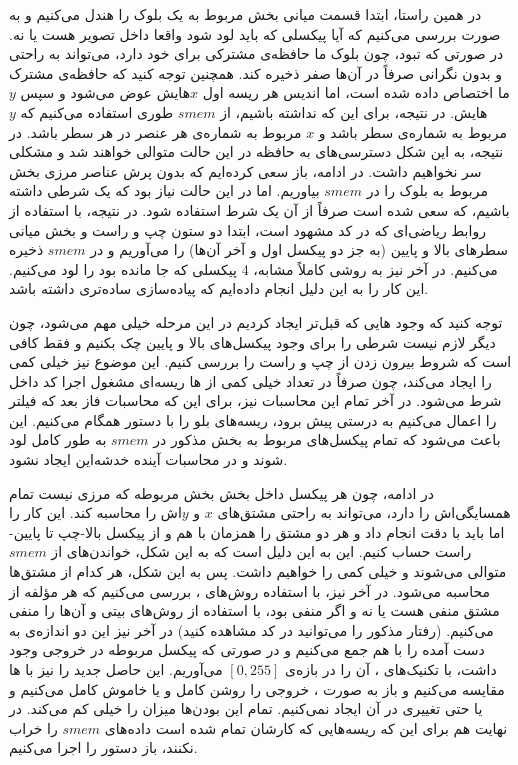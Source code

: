 \documentclass[12pt,onecolumn,a4paper]{article}
\begin{document}
در همین راستا، ابتدا قسمت میانی بخش مربوط به یک بلوک را هندل می‌کنیم و به صورت  بررسی می‌کنیم که آیا پیکسلی که باید لود شود واقعا داخل تصویر هست یا نه. در صورتی که تبود، چون بلوک ما حافظه‌ی مشترکی برای خود دارد، می‌تواند به راحتی و بدون نگرانی صرفاً در آن‌ها صفر ذخیره کند. همچنین توجه کنید که حافظه‌ی مشترک ما  اختصاص داده شده است، اما اندیس هر ریسه اول $x$هایش عوض می‌شود و سپس $y$هایش. در نتیجه، برای این که  نداشته باشیم، از $smem$ طوری استفاده می‌کنیم که $y$ مربوط به شماره‌ی سطر باشد و $x$ مربوط به شماره‌ی هر عنصر در هر سطر باشد. در نتیجه، به این شکل دسترسی‌های به حافظه در این حالت متوالی خواهند شد و مشکلی سر  نخواهیم داشت. در ادامه، باز سعی کرده‌ایم که بدون پرش عناصر مرزی بخش مربوط به بلوک را در $smem$ بیاوریم. اما در این حالت نیاز بود که یک شرطی داشته باشیم، که سعی شده است صرفاً از آن یک شرط استفاده شود. در نتیجه، با استفاده از روابط ریاضی‌ای که در کد مشهود است، ابتدا دو ستون چپ و راست و بخش میانی سطرهای بالا و پایین (به جز دو پیکسل اول و آخر آن‌ها) را می‌آوریم و در $smem$ ذخیره می‌کنیم. در آخر نیز به روشی کاملاً مشابه، 4 پیکسلی که جا مانده بود را لود می‌کنیم. این کار را به این دلیل انجام داده‌ایم که پیاده‌سازی ساده‌تری داشته باشد.

توجه کنید که وجود هایی که قبل‌تر ایجاد کردیم در این مرحله خیلی مهم می‌شود، چون دیگر لازم نیست شرطی را برای وجود پیکسل‌های بالا و پایین چک بکنیم و فقط کافی است که شروط بیرون زدن از چپ و راست را بررسی کنیم. این موضوع نیز  خیلی کمی را ایجاد می‌کند، چون صرفاً در تعداد خیلی کمی از ها ریسه‌ای مشغول اجرا کد داخل شرط می‌شود. در آخر تمام این محاسبات نیز، برای این که محاسبات فاز بعد که فیلتر را اعمال می‌کنیم به درستی پیش برود، ریسه‌های بلو را با دستور  همگام می‌کنیم. این باعث می‌شود که تمام پیکسل‌های مربوط به بخش مذکور در $smem$ به طور کامل لود شوند و در محاسبات آینده خدشه‌این ایجاد نشود.

در ادامه، چون هر پیکسل داخل بخش بخش مربوطه که مرزی نیست تمام همسایگی‌اش را دارد، می‌تواند به راحتی مشتق‌های $x$ و $y$اش را محاسبه کند. این کار را اما باید با دقت انجام داد و هر دو مشتق را همزمان با هم و از پیکسل بالا-چپ تا پایین-راست حساب کنیم. این به این دلیل است که به این شکل، خواندن‌های از $smem$ متوالی می‌شوند و  خیلی کمی را خواهیم داشت. پس به این شکل، هر کدام از مشتق‌ها محاسبه می‌شود. در آخر نیز، با استفاده روش‌های ، بررسی می‌کنیم که هر مؤلفه از مشتق منفی هست یا نه و اگر منفی بود، با استفاده از روش‌های بیتی و  آن‌ها را منفی می‌کنیم. (رفتار مذکور را می‌توانید در کد مشاهده کنید) در آخر نیز این دو اندازه‌ی به دست آمده را با هم جمع می‌کنیم و در صورتی که پیکسل مربوطه در خروجی وجود داشت، با تکنیک‌های ، آن را در بازه‌ی $[0,255]$ می‌آوریم. این حاصل جدید را نیز با ها مقایسه می‌کنیم و باز به صورت ، خروجی را روشن کامل و یا خاموش کامل می‌کنیم و یا حتی تغییری در آن ایجاد نمی‌کنیم. تمام این  بودن‌ها میزان  را خیلی کم می‌کند. در نهایت هم برای این که ریسه‌هایی که کارشان تمام شده است داده‌های $smem$ را خراب نکنند، باز دستور  را اجرا می‌کنیم.
\end{document}
